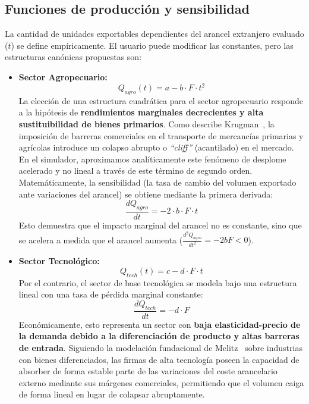 \documentclass[12pt, a4paper]{article}
\begin{document}
\subsection{Funciones de producción y sensibilidad}
La cantidad de unidades exportables dependientes del arancel extranjero evaluado ($t$) se define empíricamente. El usuario puede modificar las constantes, pero las estructuras canónicas propuestas son:
\begin{itemize}
    \item \textbf{Sector Agropecuario:}
    \begin{equation}
        Q_{agro}(t) = a - b \cdot F \cdot t^2
    \end{equation}
    La elección de una estructura cuadrática para el sector agropecuario responde a la hipótesis de \textbf{rendimientos marginales decrecientes y alta sustituibilidad de bienes primarios}. Como describe Krugman~\cite[p.~490]{krugman1991}, la imposición de barreras comerciales en el transporte de mercancías primarias y agrícolas introduce un colapso abrupto o \textit{``cliff''} (acantilado) en el mercado. En el simulador, aproximamos analíticamente este fenómeno de desplome acelerado y no lineal a través de este término de segundo orden. Matemáticamente, la sensibilidad (la tasa de cambio del volumen exportado ante variaciones del arancel) se obtiene mediante la primera derivada:
    \begin{equation}
        \frac{dQ_{agro}}{dt} = -2 \cdot b \cdot F \cdot t
    \end{equation}
    Esto demuestra que el impacto marginal del arancel no es constante, sino que se acelera a medida que el arancel aumenta ($\frac{d^2Q_{agro}}{dt^2} = -2bF < 0$).

    \item \textbf{Sector Tecnológico:}
    \begin{equation}
        Q_{tech}(t) = c - d \cdot F \cdot t
    \end{equation}
    Por el contrario, el sector de base tecnológica se modela bajo una estructura lineal con una tasa de pérdida marginal constante:
    \begin{equation}
        \frac{dQ_{tech}}{dt} = -d \cdot F
    \end{equation}
    Económicamente, esto representa un sector con \textbf{baja elasticidad-precio de la demanda debido a la diferenciación de producto y altas barreras de entrada}. Siguiendo la modelación fundacional de Melitz~\cite[p.~1700]{melitz2003} sobre industrias con bienes diferenciados, las firmas de alta tecnología poseen la capacidad de absorber de forma estable parte de las variaciones del coste arancelario externo mediante sus márgenes comerciales, permitiendo que el volumen caiga de forma lineal en lugar de colapsar abruptamente.
\end{itemize}
\end{document}

